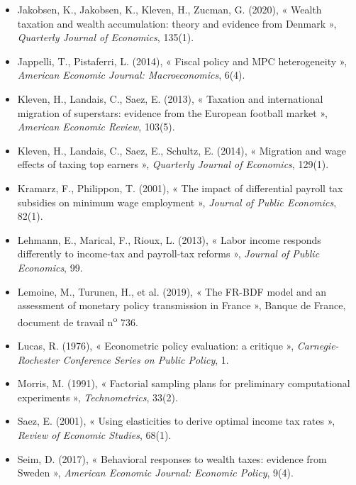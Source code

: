 \begin{small}
\begin{itemize}[leftmargin=1em]
\item Jakobsen, K., Jakobsen, K., Kleven, H., Zucman, G. (2020), « Wealth taxation and wealth accumulation: theory and
evidence from Denmark », \emph{Quarterly Journal of Economics}, 135(1).
\item Jappelli, T., Pistaferri, L. (2014), « Fiscal policy and MPC heterogeneity », \emph{American Economic Journal:
Macroeconomics}, 6(4).
\item Kleven, H., Landais, C., Saez, E. (2013), « Taxation and international migration of superstars: evidence from the
European football market », \emph{American Economic Review}, 103(5).
\item Kleven, H., Landais, C., Saez, E., Schultz, E. (2014), « Migration and wage effects of taxing top earners »,
\emph{Quarterly Journal of Economics}, 129(1).
\item Kramarz, F., Philippon, T. (2001), « The impact of differential payroll tax subsidies on minimum wage employment »,
\emph{Journal of Public Economics}, 82(1).
\item Lehmann, E., Marical, F., Rioux, L. (2013), « Labor income responds differently to income-tax and payroll-tax
reforms », \emph{Journal of Public Economics}, 99.
\item Lemoine, M., Turunen, H., et al. (2019), « The FR-BDF model and an assessment of monetary policy transmission in
France », Banque de France, document de travail n\textsuperscript{o} 736.
\item Lucas, R. (1976), « Econometric policy evaluation: a critique », \emph{Carnegie-Rochester Conference Series on
Public Policy}, 1.
\item Morris, M. (1991), « Factorial sampling plans for preliminary computational experiments », \emph{Technometrics},
33(2).
\item Saez, E. (2001), « Using elasticities to derive optimal income tax rates », \emph{Review of Economic Studies}, 68(1).
\item Seim, D. (2017), « Behavioral responses to wealth taxes: evidence from Sweden », \emph{American Economic Journal:
Economic Policy}, 9(4).
\end{itemize}


\end{small}
